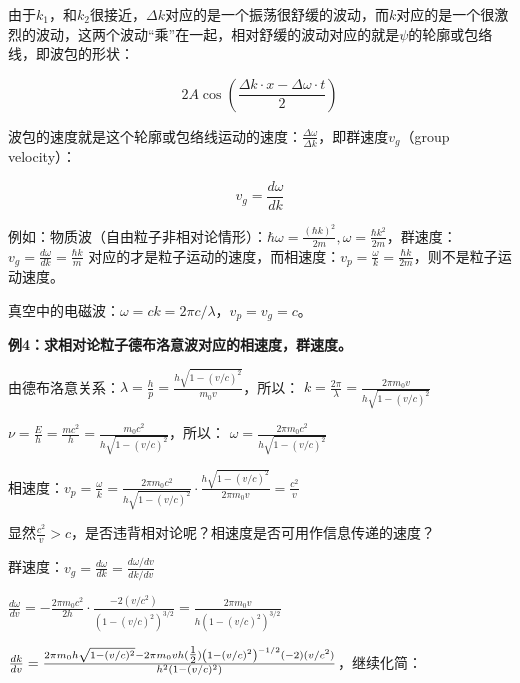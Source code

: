 由于$k_1$，和$k_2$很接近，$\Delta k$对应的是一个振荡很舒缓的波动，而$k$对应的是一个很激烈的波动，这两个波动“乘”在一起，相对舒缓的波动对应的就是$\psi$的轮廓或包络线，即波包的形状：

\begin{equation}
2A\cos \left( {\frac{{\Delta k \cdot x - \Delta \omega  \cdot t}}{2}} \right)
\end{equation}

波包的速度就是这个轮廓或包络线运动的速度：$\frac{{\Delta \omega }}{{\Delta k}}$，即群速度$v_g$（group velocity）：

\begin{equation}
v_g  = \frac{{d\omega }}{{dk}}
\end{equation}

例如：物质波（自由粒子非相对论情形）：$\hbar \omega  = \frac{{(\hbar k)^2 }}{{2m}},\omega  = \frac{{\hbar k^2 }}{{2m}}$，群速度：$v_g  = \frac{{d\omega }}{{dk}} = \frac{{\hbar k}}{m}$ 对应的才是粒子运动的速度，而相速度：$v_p  = \frac{\omega }{k} = \frac{{\hbar k}}{{2m}}$，则不是粒子运动速度。

真空中的电磁波：$\omega  = c k  = 2\pi c/\lambda $，$v_p  = v_g  = c$。

\textbf{例4：求相对论粒子德布洛意波对应的相速度，群速度。}

由德布洛意关系：$\lambda  = \frac{h}{p} = \frac{{h\sqrt {1 - (v/c)^2 } }}{{m_0 v}}$，所以：
$k = \frac{{2\pi }}{\lambda } = \frac{{2\pi m_0 v}}{{h\sqrt {1 - (v/c)^2 } }}$

$\nu  = \frac{E}{h} = \frac{{mc^2 }}{h} = \frac{{m_0 c^2 }}{{h\sqrt {1 - (v/c)^2 } }}$，所以：
$\omega  = \frac{{2\pi m_0 c^2 }}{{h\sqrt {1 - (v/c)^2 } }}$

相速度：$v_p  = \frac{\omega }{k} = \frac{{2\pi m_0 c^2 }}{{h\sqrt
{1 - (v/c)^2 } }} \cdot \frac{{h\sqrt {1 - (v/c)^2 } }}{{2\pi m_0
v}} = \frac{{c^2 }}{v}$


显然$\frac{{c^2 }}{v} > c$，是否违背相对论呢？相速度是否可用作信息传递的速度？

群速度：$v_g  = \frac{{d\omega }}{{dk}} = \frac{{d\omega /dv}}{{dk/dv}}$

$\frac{{d\omega }}{{dv}} =  - \frac{{2\pi m_0 c^2 }}{{2h}} \cdot \frac{{ - 2(v/c^2 )}}{{\left( {1 - (v/c)^2 } \right)^{3/2} }} = \frac{{2\pi m_0 v}}{{h\left( {1 - (v/c)^2 } \right)^{3/2} }}$

$\frac{{dk}}{{dv}} = \frac{{2\pi m_0 h\sqrt {1 - (v/c)^2 }  - 2\pi m_0 vh({\textstyle{1 \over 2}})\left( {1 - (v/c)^2 } \right)^{ - 1/2} ( - 2)(v/c^2 )}}{{h^2 \left( {1 - (v/c)^2 } \right)}}$，继续化简：

